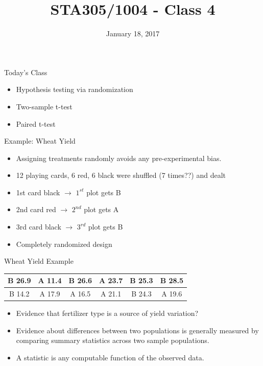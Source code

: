 \documentclass[9pt,ignorenonframetext,]{beamer}
\title{STA305/1004 - Class 4}
\date{January 18, 2017}
\providecommand{\tightlist}{%
\setlength{\itemsep}{0pt}\setlength{\parskip}{0pt}}
\begin{document}
\frame{\titlepage}

\begin{frame}{Today's Class}

\begin{itemize}
\tightlist
\item
  Hypothesis testing via randomization
\item
  Two-sample t-test
\item
  Paired t-test
\end{itemize}

\end{frame}

\begin{frame}{Example: Wheat Yield}

\begin{itemize}
\item
  Assigning treatments randomly avoids any pre-experimental bias.
\item
  12 playing cards, 6 red, 6 black were shuffled (7 times??) and dealt
\item
  1st card black \(\rightarrow\) \(1^{st}\) plot gets B
\item
  2nd card red \(\rightarrow\) \(2^{nd}\) plot gets A
\item
  3rd card black \(\rightarrow\) \(3^{rd}\) plot gets B
\item
  Completely randomized design
\end{itemize}

\end{frame}

\begin{frame}{Wheat Yield Example}

\begin{table}[]
\centering
\label{my-label}
\begin{tabular}{|c|c|c|c|c|c|}
\hline
B 26.9 & A 11.4 & B 26.6     & A 23.7 & B 25.3 & B 28.5 \\ \hline
B 14.2 & A 17.9 & A 16.5 & A 21.1 & B 24.3 & A  19.6 \\ \hline
\end{tabular}
\end{table}

\begin{itemize}
\tightlist
\item
  Evidence that fertilizer type is a source of yield variation?
\item
  Evidence about differences between two populations is generally
  measured by comparing summary statistics across two sample
  populations.
\item
  A statistic is any computable function of the observed data.
\end{itemize}

\end{frame}
\end{document}
